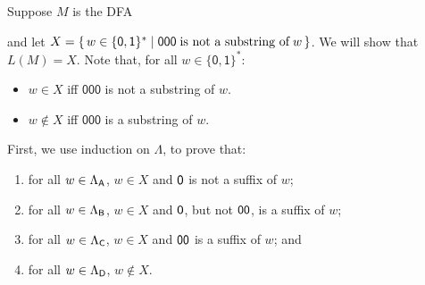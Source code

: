 Suppose $M$ is the DFA
\begin{center}

\end{center}
and let $X=\{ \, w\in\{\mathsf{0,1}\}^* \mid \mathsf{000}\;\allowbreak\mbox{is not a
    substring of}\allowbreak\;w \, \}$.  We will show that $L(M)=X$.  Note that, for all
$w\in\{\mathsf{0,1}\}^*$:
\begin{itemize}
\item $w\in X$ iff $\mathsf{000}$ is not a substring of $w$.

\item $w\not\in X$ iff $\mathsf{000}$ is a substring of $w$.
\end{itemize}

First, we use induction on $\Lambda$, to prove that:
\begin{enumerate}[\quad(A)]
\item for all $w\in\Lambda_{\mathsf{A}}$, $w\in X$ and $\mathsf{0}$ is not a
  suffix of $w$;

\item for all $w\in\Lambda_{\mathsf{B}}$, $w\in X$ and $\mathsf{0}$, but not
  $\mathsf{0}\mathsf{0}$, is a suffix of $w$;

\item for all $w\in\Lambda_{\mathsf{C}}$, $w\in X$ and $\mathsf{0}\mathsf{0}$ is a
  suffix of $w$; and

\item for all $w\in\Lambda_{\mathsf{D}}$, $w\not\in X$.
\end{enumerate}

